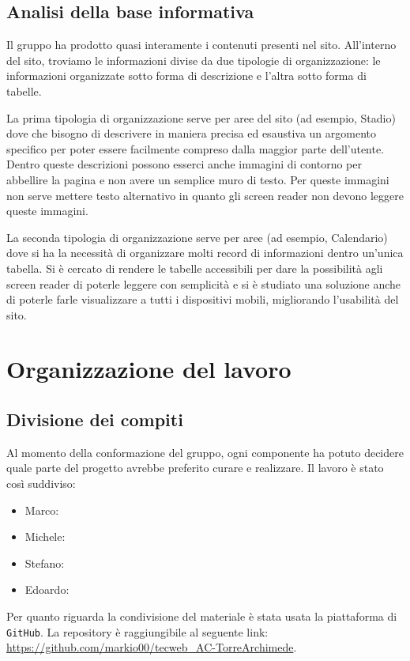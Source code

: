 \documentclass[12pt, a4paper]{article}
\begin{document}
\subsection{Analisi della base informativa}
Il gruppo ha prodotto quasi interamente i contenuti presenti nel sito. All'interno del sito, troviamo le informazioni divise da due tipologie di organizzazione: le informazioni organizzate sotto forma di descrizione e l'altra sotto forma di tabelle.\par
La prima tipologia di organizzazione serve per aree del sito (ad esempio, Stadio) dove che bisogno di descrivere in maniera precisa ed esaustiva un argomento specifico per poter essere facilmente compreso dalla maggior parte dell'utente. Dentro queste descrizioni possono esserci anche immagini di contorno per abbellire la pagina e non avere un semplice muro di testo.
Per queste immagini non serve mettere testo alternativo in quanto gli screen reader non devono leggere queste immagini.\par
La seconda tipologia di organizzazione serve per aree (ad esempio, Calendario) dove si ha la necessità di organizzare molti record di informazioni dentro un'unica tabella. Si è cercato di rendere le tabelle accessibili per dare la possibilità agli screen reader di poterle leggere con semplicità e si è studiato una soluzione anche di poterle farle visualizzare a tutti i dispositivi mobili, 
migliorando l'usabilità del sito.

\section{Organizzazione del lavoro}

\subsection{Divisione dei compiti}
Al momento della conformazione del gruppo, ogni componente ha potuto decidere quale parte del progetto avrebbe preferito curare e realizzare.
Il lavoro è stato così suddiviso:

\begin{itemize}
	\item Marco:
	\item Michele:
	\item Stefano:
	\item Edoardo:
\end{itemize}

Per quanto riguarda la condivisione del materiale è stata usata la piattaforma di \texttt{GitHub}. La 
repository è raggiungibile al seguente link: \url{https://github.com/markio00/tecweb_AC-TorreArchimede}.
\end{document}
